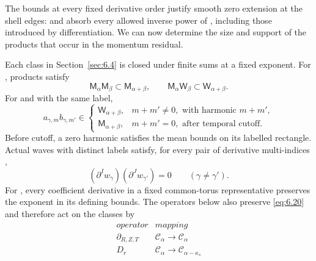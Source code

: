The bounds at every fixed derivative order justify smooth zero extension at
the shell edges:  and
 absorb every allowed inverse power of
, including those introduced by differentiation.
We can now determine the size and support of the products that occur in the
momentum residual.

\begin{proposition}\label{prop:6.6}
Each class in Section~\ref{sec:6.4} is closed under finite sums at a fixed
exponent. For , products satisfy
\begin{equation}
  \mathsf M_\alpha\mathsf M_\beta\subset\mathsf M_{\alpha+\beta},
  \qquad
  \mathsf M_\alpha\mathsf W_\beta\subset\mathsf W_{\alpha+\beta}.
  \tag{6.30}\label{eq:6.30}
\end{equation}
For  and
 with the same label,
\begin{equation}
  a_{\gamma,m}b_{\gamma,m'}\in
  \begin{cases}
    \mathsf W_{\alpha+\beta},&m+m'\ne0,
      \text{ with harmonic }m+m',\\
    \mathsf M_{\alpha+\beta},&m+m'=0,
      \text{ after temporal cutoff}.
  \end{cases}
  \tag{6.31}\label{eq:6.31}
\end{equation}
Before cutoff, a zero harmonic satisfies the mean bounds on its labelled
rectangle. Actual waves with distinct labels satisfy, for every pair of
derivative multi-indices ,
\[
  (\partial^Iw_\gamma)(\partial^Jw_{\gamma'})=0
  \qquad(\gamma\ne\gamma').
\]
For , every coefficient
derivative in a fixed common-torus representative preserves the
 exponent in its defining bounds. The
operators below also preserve \eqref{eq:6.20} and therefore act on the classes
by
\begin{equation}
  \begin{array}{c|c}
    \textit{operator}&\textit{mapping}\\ \hline
    \partial_{R,Z,T}&\mathcal C_\alpha\longrightarrow \mathcal C_\alpha\\
    D_r&\mathcal C_\alpha\longrightarrow \mathcal C_{\alpha-\kappa_s}\\

\end{array}
\end{equation}
\end{proposition}

